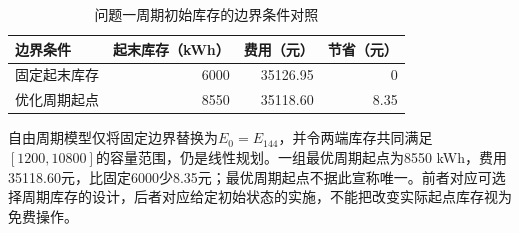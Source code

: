 \begin{table}[htbp]
\centering
\caption{问题一周期初始库存的边界条件对照}
\begin{tabular}{lrrr}
\toprule
边界条件 & 起末库存（kWh） & 费用（元） & 节省（元）\\
\midrule
固定起末库存 & 6000 & 35126.95 & 0\\
优化周期起点 & 8550 & 35118.60 & 8.35\\
\bottomrule
\end{tabular}
\end{table}


自由周期模型仅将固定边界替换为$E_0=E_{144}$，并令两端库存共同满足$[1200,10800]$的容量范围，仍是线性规划。一组最优周期起点为8550 kWh，费用35118.60元，比固定6000少8.35元；最优周期起点不据此宣称唯一。前者对应可选择周期库存的设计，后者对应给定初始状态的实施，不能把改变实际起点库存视为免费操作。
